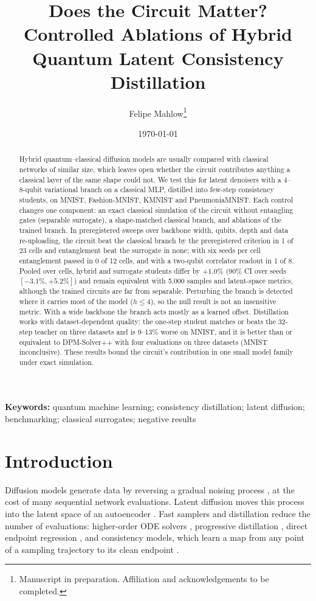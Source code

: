 \documentclass[11pt]{article}
\title{Does the Circuit Matter? Controlled Ablations of Hybrid Quantum Latent Consistency Distillation}
\author{Felipe Mahlow\thanks{Manuscript in preparation. Affiliation and acknowledgements to be completed.}}
\date{\today}
\begin{document}
\maketitle

\begin{abstract}
Hybrid quantum--classical diffusion models are usually compared with classical
networks of similar size, which leaves open whether the circuit contributes
anything a classical layer of the same shape could not. We test this for latent
denoisers with a 4--8-qubit variational branch on a classical MLP, distilled into
few-step consistency students, on MNIST, Fashion-MNIST, KMNIST and PneumoniaMNIST.
Each control changes one component: an exact classical simulation of the circuit
without entangling gates (separable surrogate), a shape-matched classical branch,
and ablations of the trained branch. In preregistered sweeps over backbone width,
qubits, depth and data re-uploading, the circuit beat the classical branch by the
preregistered criterion in 1 of 23 cells and entanglement beat the surrogate in
none; with six seeds per cell entanglement passed in 0 of 12 cells, and with a
two-qubit correlator readout in 1 of 8. Pooled over cells, hybrid and surrogate
students differ by $+1.0\%$ (90\% CI over seeds $[-3.1\%, +5.2\%]$) and remain
equivalent with 5{,}000 samples and latent-space metrics, although the trained
circuits are far from separable. Perturbing the branch is detected where it carries
most of the model ($h\le4$), so the null result is not an insensitive metric. With
a wide backbone the branch acts mostly as a learned offset. Distillation works with
dataset-dependent quality: the one-step student matches or beats the 32-step
teacher on three datasets and is 9--13\% worse on MNIST, and it is better than or
equivalent to DPM-Solver++ with four evaluations on three datasets (MNIST
inconclusive). These results bound the circuit's contribution in one small model
family under exact simulation.
\end{abstract}

\textbf{Keywords:} quantum machine learning; consistency distillation; latent
diffusion; benchmarking; classical surrogates; negative results

\section{Introduction}

Diffusion models generate data by reversing a gradual noising process
\citep{ho2020ddpm}, at the cost of many sequential network evaluations.
Latent diffusion moves this process into the latent space of an autoencoder
\citep{rombach2022ldm}. Fast samplers and distillation reduce the number of
evaluations: higher-order ODE solvers \citep{lu2022dpmsolver}, progressive
distillation \citep{salimans2022progressive}, direct endpoint regression
\citep{luhman2021knowledge}, and consistency models, which learn a map from any
point of a sampling trajectory to its clean endpoint
\citep{song2023consistency,song2024improved,luo2023lcm}.
\end{document}
